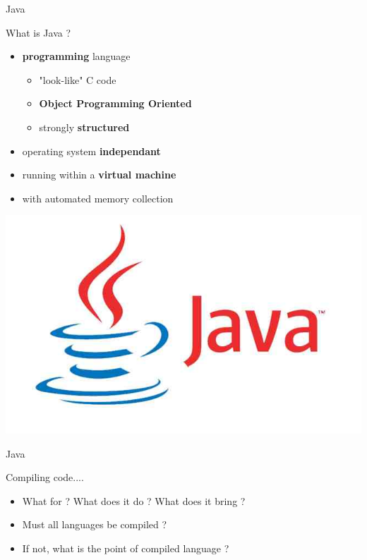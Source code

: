 {  \begin{frame}{Java}
    \begin{block}{What is Java ?}
      \begin{itemize}
        \item \textbf{programming} language
        \begin{itemize}
          \item "look-like" C code
          \item \textbf{Object Programming Oriented}
          \item strongly \textbf{structured}
        \end{itemize}
        \item operating system \textbf{independant}
        \item running within a \textbf{virtual machine}
        \item with automated memory collection
      \end{itemize}
    \end{block}

    \begin{center}
      \includegraphics[scale=0.2]{img/java-logo.jpg}
    \end{center}
  \end{frame}

  \begin{frame}{Java}
    \begin{block}{Compiling code....}
      \begin{itemize}
        \item What for ? What does it do ? What does it bring ?
        \item Must all languages be compiled ?
        \item If not, what is the point of compiled language ?
      \end{itemize}
    \end{block}
  \end{frame}

}
